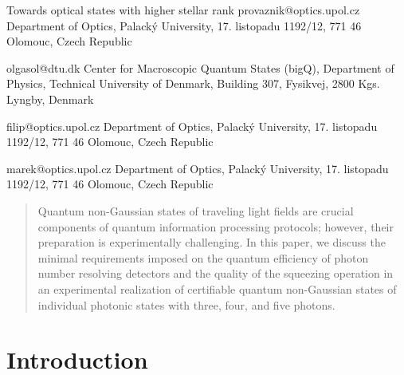 \documentclass{article}
\begin{document}
\ArticleTitle
  {Towards optical states with higher stellar rank}
  {provaznik@optics.upol.cz}
\ArticleAuthorAddress
  {Department of Optics, Palack\'{y} University, 17. listopadu 1192/12, 771 46 Olomouc, Czech Republic}

  {olgasol@dtu.dk}
\ArticleAuthorAddress
  {Center for Macroscopic Quantum States (bigQ), Department of Physics, Technical University of Denmark, Building 307, Fysikvej, 2800 Kgs. Lyngby, Denmark}

  {filip@optics.upol.cz}
\ArticleAuthorAddress
  {Department of Optics, Palack\'{y} University, 17. listopadu 1192/12, 771 46 Olomouc, Czech Republic}

  {marek@optics.upol.cz}
\ArticleAuthorAddress
  {Department of Optics, Palack\'{y} University, 17. listopadu 1192/12, 771 46 Olomouc, Czech Republic}

\ArticleTitlePrint

\begin{abstract}\noindent
  Quantum non-Gaussian states of traveling light fields are crucial components of quantum information processing protocols; however, their preparation is experimentally challenging. In this paper, we discuss the minimal requirements imposed on the quantum efficiency of photon number resolving detectors and the quality of the squeezing operation in an experimental realization of certifiable quantum non-Gaussian states of individual photonic states with three, four, and five photons.
\end{abstract}


%

\section{Introduction}
\end{document}
